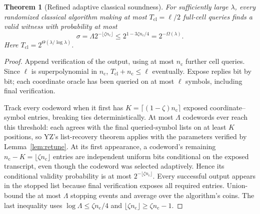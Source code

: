 \documentclass[11pt]{article}
\newtheorem{theorem}{Theorem}[section]
\theoremstyle{definition}\newtheorem{definition}[theorem]{Definition}
\theoremstyle{remark}\newtheorem{remark}[theorem]{Remark}
\begin{document}
\begin{theorem}[Refined adaptive classical soundness]\label{thm:soundness}
For sufficiently large \(\lambda\), every randomized classical algorithm making at most \(T_{\mathrm{cl}}=\ell/2\) full-cell queries finds a valid witness with probability at most
\[
 \sigma=\Lambda2^{-\lfloor\zeta n_{\mathrm c}\rfloor}\le2^{1-3\zeta n_{\mathrm c}/4}=2^{-\Omega(\lambda)}.
\]
Here \(T_{\mathrm{cl}}=2^{\Theta(\lambda/\log\lambda)}\).
\end{theorem}
\begin{proof}
Append verification of the output, using at most \(n_{\mathrm c}\) further cell queries. Since \(\ell\) is superpolynomial in \(n_{\mathrm c}\), \(T_{\mathrm{cl}}+n_{\mathrm c}\le\ell\) eventually. Expose replies bit by bit; each coordinate oracle has been queried on at most \(\ell\) symbols, including final verification.

Track every codeword when it first has \(K=\lceil(1-\zeta)n_{\mathrm c}\rceil\) exposed coordinate--symbol entries, breaking ties deterministically. At most \(\Lambda\) codewords ever reach this threshold: each agrees with the final queried-symbol lists on at least \(K\) positions, so YZ's list-recovery theorem \cite[Lemma~4.3]{YZ24} applies with the parameters verified by Lemma~\ref{lem:retune}. At its first appearance, a codeword's remaining \(n_{\mathrm c}-K=\lfloor\zeta n_{\mathrm c}\rfloor\) entries are independent uniform bits conditional on the exposed transcript, even though the codeword was selected adaptively. Hence its conditional validity probability is at most \(2^{-\lfloor\zeta n_{\mathrm c}\rfloor}\). Every successful output appears in the stopped list because final verification exposes all required entries. Union-bound the at most \(\Lambda\) stopping events and average over the algorithm's coins. The last inequality uses \(\log\Lambda\le\zeta n_{\mathrm c}/4\) and \(\lfloor\zeta n_{\mathrm c}\rfloor\ge\zeta n_{\mathrm c}-1\).
\end{proof}
\end{document}
